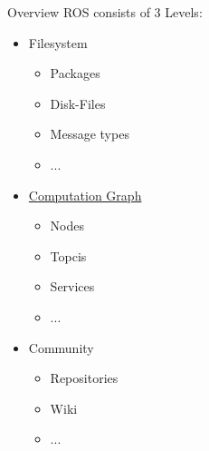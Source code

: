 \documentclass{beamer}
\begin{document}
\begin{frame}{Overview}
	ROS consists of 3 Levels:
	\begin{itemize}
		\item Filesystem
			\begin{itemize}
				\item Packages
				\item Disk-Files
				\item Message types
				\item ...
			\end{itemize}
		\item \underline{Computation Graph}
			\begin{itemize}
				\item Nodes
				\item Topcis
				\item Services
				\item ...
			\end{itemize}
		\item Community
			\begin{itemize}
				\item Repositories
				\item Wiki
				\item ...
			\end{itemize}
	\end{itemize}
\end{frame}
\end{document}
